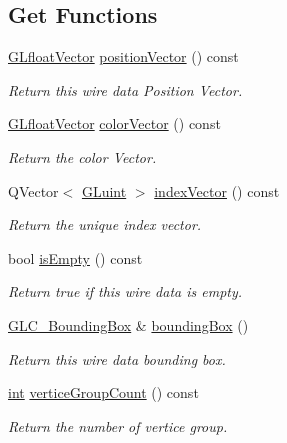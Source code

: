 \subsection*{Get Functions}
\begin{DoxyCompactItemize}
\item 
\hyperlink{glc__global_8h_a9f3f0b00cd127b066c9931b9c257a046}{G\-Lfloat\-Vector} \hyperlink{class_g_l_c___wire_data_a8fc80ce78c8649ebaecc6ed91204a0c3}{position\-Vector} () const 
\begin{DoxyCompactList}\small\item\em Return this wire data Position Vector. \end{DoxyCompactList}\item 
\hyperlink{glc__global_8h_a9f3f0b00cd127b066c9931b9c257a046}{G\-Lfloat\-Vector} \hyperlink{class_g_l_c___wire_data_ad3ae005c85666e5faaadace61070de33}{color\-Vector} () const 
\begin{DoxyCompactList}\small\item\em Return the color Vector. \end{DoxyCompactList}\item 
Q\-Vector$<$ \hyperlink{glext_8h_a2f0c8cd5c21f9fcbd931c3f48bc90dfc}{G\-Luint} $>$ \hyperlink{class_g_l_c___wire_data_a7be75faa2f1fb66e842cfe220fa91af5}{index\-Vector} () const 
\begin{DoxyCompactList}\small\item\em Return the unique index vector. \end{DoxyCompactList}\item 
bool \hyperlink{class_g_l_c___wire_data_add10e1124ca35d597567968499c5dd58}{is\-Empty} () const 
\begin{DoxyCompactList}\small\item\em Return true if this wire data is empty. \end{DoxyCompactList}\item 
\hyperlink{class_g_l_c___bounding_box}{G\-L\-C\-\_\-\-Bounding\-Box} \& \hyperlink{class_g_l_c___wire_data_a65b6322e35da026dcfa24816aed5e3ff}{bounding\-Box} ()
\begin{DoxyCompactList}\small\item\em Return this wire data bounding box. \end{DoxyCompactList}\item 
\hyperlink{ioapi_8h_a787fa3cf048117ba7123753c1e74fcd6}{int} \hyperlink{class_g_l_c___wire_data_ae258a8c1223e19cb256d4c06620d2669}{vertice\-Group\-Count} () const 
\begin{DoxyCompactList}\small\item\em Return the number of vertice group. \end{DoxyCompactList}\item 

\end{DoxyCompactItemize}
